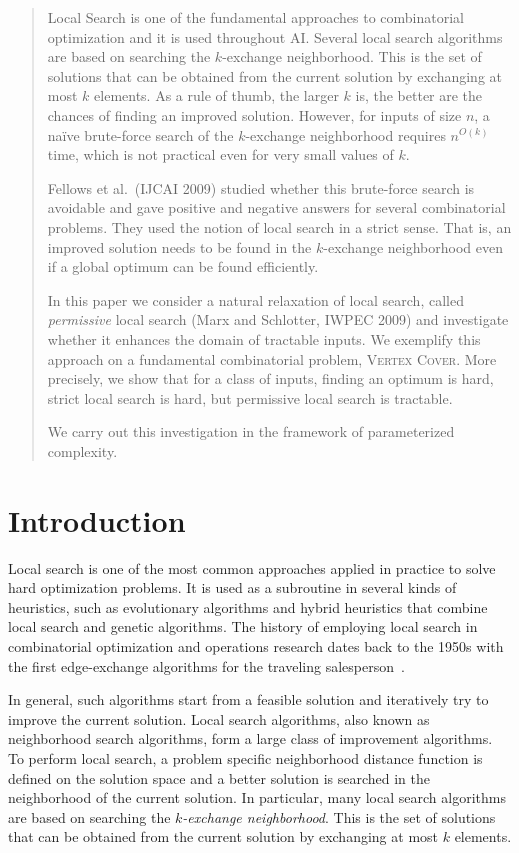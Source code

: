 \documentclass[10pt,usletter]{article}
\begin{document}
\begin{abstract}
Local Search is one of the fundamental approaches to
combinatorial optimization and it is used throughout AI.
Several local search algorithms are based on searching
the $k$-exchange neighborhood. This is the
set of solutions that can be obtained from the current
solution by exchanging at most $k$ elements.
As a rule of thumb, the larger $k$ is, the better
are the chances of finding an improved solution.
However, for inputs of size $n$, a na\"ive brute-force
search of the $k$-exchange neighborhood requires
$n^{O(k)}$ time, which is not practical even for very
small values of $k$.

Fellows et al.\ (IJCAI 2009) studied whether this brute-force
search is avoidable and gave positive and negative answers
for several combinatorial problems.
They used the notion of local search in a strict sense. That is, 
an improved solution needs to be found in the $k$-exchange
neighborhood even if a global optimum can be found efficiently.

In this paper we consider a natural relaxation of local search,
called \emph{permissive} local search (Marx and Schlotter, IWPEC 2009) and investigate whether
it enhances the domain of tractable inputs.
We exemplify this approach on a fundamental combinatorial problem,
\textsc{Vertex Cover}. More precisely, we show that for a class of inputs,
finding an optimum is hard, strict local search is hard, but permissive local
search is tractable.

We carry out this investigation in the framework of
parameterized complexity.
\end{abstract}



\section{Introduction}

Local search is one of the most common approaches applied in practice
to solve hard optimization problems.  It is used as a subroutine in
several kinds of heuristics, such as evolutionary algorithms and
hybrid heuristics that combine local search and genetic
algorithms. The history of employing local search in combinatorial
optimization and operations research dates back to the 1950s with the
first edge-exchange algorithms for the traveling salesperson~\citep{Bock58,Cores58}.

In general, such algorithms start from a feasible solution and
iteratively try to improve the current solution. Local search
algorithms, also known as neighborhood search algorithms, form a large
class of improvement algorithms. To perform local search, a problem
specific neighborhood distance function is defined on the solution
space and a better solution is searched in the neighborhood of the
current solution. In particular, many local search algorithms are
based on searching the \emph{$k$-exchange neighborhood}. This is the set
of solutions that can be obtained from the current solution by
exchanging at most $k$ elements. 
\end{document}
